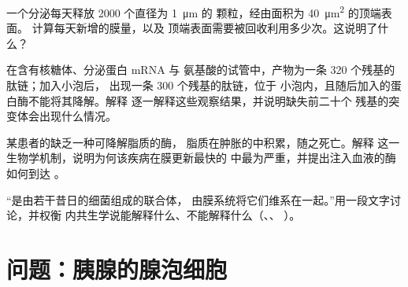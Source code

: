 \begin{exercise}[$\star\star$]\label{exo:b1:eukaryotic-cell:9}
一个分泌每天释放 \qty{2000}{} 个直径为 \qty{1}{\micro m} 的
颗粒，经由面积为 \qty{40}{\micro m^2} 的顶端表面。
计算每天新增的膜量，以及
顶端表面需要被回收利用多少次。这说明了什么？
\end{exercise}

\begin{exercise}[$\star\star\star$]\label{exo:b1:eukaryotic-cell:10}
在含有核糖体、分泌蛋白 mRNA 与
氨基酸的试管中，产物为一条 \qty{320}{} 个残基的肽链；加入小泡后，
出现一条 \qty{300}{} 个残基的肽链，位于
小泡内，且随后加入的蛋白酶不能将其降解。解释
逐一解释这些观察结果，并说明缺失前二十个
残基的突变体会出现什么情况。
\end{exercise}

\begin{exercise}[$\star\star\star$]\label{exo:b1:eukaryotic-cell:11}
某患者的缺乏一种可降解脂质的酶，
脂质在肿胀的中积累，随之死亡。解释
这一生物学机制，说明为何该疾病在膜更新最快的
中最为严重，并提出注入血液的酶如何到达
。
\end{exercise}

\begin{exercise}[$\star\star\star$]\label{exo:b1:eukaryotic-cell:12}
“是由若干昔日的细菌组成的联合体，
由膜系统将它们维系在一起。”用一段文字讨论，并权衡
内共生学说能解释什么、不能解释什么（、、
）。
\end{exercise}

\section{问题：胰腺的腺泡细胞}

